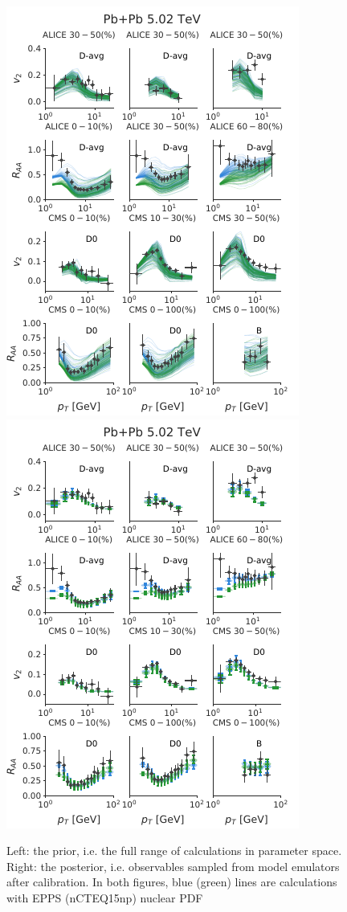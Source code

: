 \documentclass[aps, prc, reprint, amsmath, groupedaddress, nofootinbib]{revtex4-1}
\begin{document}
\begin{figure}
\includegraphics[width=.49\textwidth]{observables_design.pdf}
\includegraphics[width=.49\textwidth]{observables_posterior.pdf}
\caption{Left: the prior, i.e. the full range of calculations in parameter space. Right: the posterior, i.e. observables sampled from model emulators after calibration. In both figures, blue (green) lines are calculations with EPPS (nCTEQ15np) nuclear PDF}\label{plots:deisgn_posterior_obs}
\end{figure}
\end{document}
